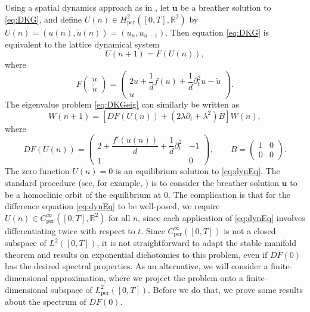 \documentclass[12pt,reqno]{amsart}
\def\R{{\mathbb R}}
\def\per{\textrm{per}}
\newcommand{\uvec}{\mathbf{u}}
\begin{document}
Using a spatial dynamics approach as in \cites{Parker2020,Parker2021}, let $\uvec$ be a breather solution to \cref{eq:DKG}, and define $U(n) \in H^2_\per([0,T], \R^2)$ by $U(n) = (u(n), \tilde{u}(n)) = ( u_n, u_{n-1} )$. Then equation \cref{eq:DKG} is equivalent to the lattice dynamical system
\begin{equation}\label{eq:dynEq}
U(n+1) = F(U(n)),
\end{equation}
where
\begin{equation}\label{eq:F}
F\begin{pmatrix}u \\ \tilde{u} \end{pmatrix} = 
\begin{pmatrix}2u  + \dfrac{1}{d}f(u) + \dfrac{1}{d} \partial_t^2 u - \tilde{u} \\
u
\end{pmatrix}.
\end{equation}
The eigenvalue problem \cref{eq:DKGeig} can similarly be written as 
\begin{equation}\label{eq:dynEVP}
W(n+1) = \left[ DF(U(n)) + (2 \lambda \partial_t + \lambda^2) B \right] W(n),
\end{equation}
where
\begin{equation}\label{eq:DF0}
DF(U(n)) = \begin{pmatrix}
2 + \dfrac{f'(u(n))}{d} + \dfrac{1}{d}\partial_t^2  & -1 \\ 1 & 0
\end{pmatrix}, \qquad
B = \begin{pmatrix} 1 & 0 \\ 0 & 0 \end{pmatrix}.
\end{equation}
The zero function $U(n) = 0$ is an equilibrium solution to \cref{eq:dynEq}. The standard procedure (see, for example, \cites{Parker2021,Parker2020,Sandstede1998}) is to consider the breather solution $\uvec$ to be a homoclinic orbit of the equilibrium at 0. The complication is that for the difference equation \cref{eq:dynEq} to be well-posed, we require $U(n) \in C_\per^\infty([0,T],\R^2)$ for all $n$, since each application of \cref{eq:dynEq} involves differentiating twice with respect to $t$. Since $C_\per^\infty([0,T])$ is not a closed subspace of $L^2([0,T])$, it is not straightforward to adapt the stable manifold theorem and results on exponential dichotomies to this problem, even if $DF(0)$ has the desired spectral properties. As an alternative, we will consider a finite-dimensional approximation, where we project the problem onto a finite-dimensional subspace of $L_\per^2([0,T])$. Before we do that, we prove some results about the spectrum of $DF(0)$.
\end{document}
